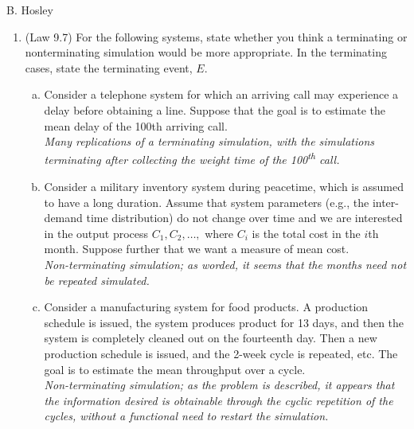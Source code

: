 \documentclass[12pt]{amsart}
\begin{document}
\raggedbottom

\hspace{\fill} {\large B. Hosley}
\bigskip


\begin{enumerate}[1.]
\item (Law 9.7) For the following systems, state whether you think a terminating or nonterminating
simulation would be more appropriate. In the terminating cases, state the terminating event, \(E\). \\

\begin{enumerate}[a.]
	\item Consider a telephone system for which an arriving call may experience a delay before
	obtaining a line. Suppose that the goal is to estimate the mean delay of the 100th arriving
	call. \\
	
	\textit{Many replications of a terminating simulation, 
		with the simulations terminating after collecting 
		the weight time of the 100\textsuperscript{th} call.} \\
	
	\item Consider a military inventory system during peacetime, which is assumed to have a long
	duration. Assume that system parameters (e.g., the inter-demand time distribution) do not
	change over time and we are interested in the output process \(C_1 , C_2 ,\ldots,\) where \(C_i\) is the
	total cost in the \(i\)th month. Suppose further that we want a measure of mean cost. \\
	
	\textit{Non-terminating simulation; as worded, it seems that the months need not be repeated simulated.}\\
	
	\item Consider a manufacturing system for food products. A production schedule is issued, the
	system produces product for 13 days, and then the system is completely cleaned out on the
	fourteenth day. Then a new production schedule is issued, and the 2-week cycle is
	repeated, etc. The goal is to estimate the mean throughput over a cycle. \\
	
	\textit{Non-terminating simulation; as the problem is described, it appears that 
	the information desired is obtainable through the cyclic repetition of the cycles,
	without a functional need to restart the simulation.}\\
	

\end{enumerate}
\end{enumerate}
\end{document}
